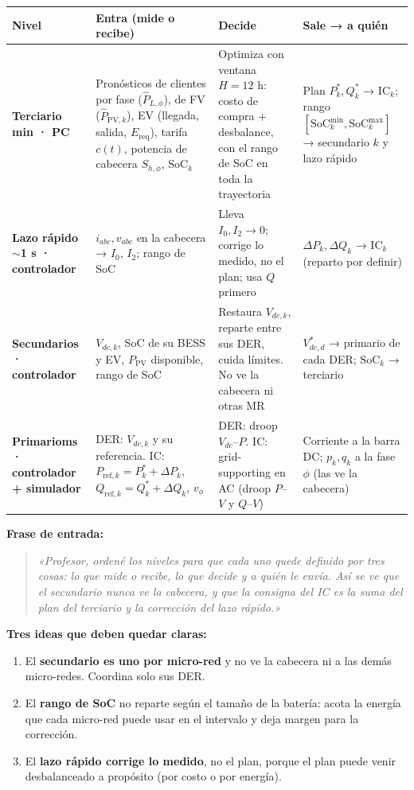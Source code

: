\documentclass[10pt,a4paper]{article}
\newcommand{\SoC}{\mathrm{SoC}}
\newcommand{\di}[1]{\begin{quote}\itshape «#1»\end{quote}}
\begin{document}
\renewcommand{\arraystretch}{1.25}
\begin{tabularx}{\textwidth}{>{\bfseries}p{1.9cm}XXX}
\toprule
Nivel & Entra (mide o recibe) & Decide & Sale → a quién\\
\midrule
Terciario\newline 15 min · PC & Pronósticos de clientes por fase ($\hat P_{L,\phi}$), de FV ($\hat P_{\mathrm{PV},k}$), EV (llegada, salida, $E_{\mathrm{req}}$), tarifa $c(t)$, potencia de cabecera $S_{h,\phi}$, $\SoC_k$ & Optimiza con ventana $H=12$ h: costo de compra + desbalance, con el rango de SoC en toda la trayectoria & Plan $P^*_k,Q^*_k$ → IC$_k$; rango $[\SoC^{\min}_k,\SoC^{\max}_k]$ → secundario $k$ y lazo rápido\\
Lazo rápido\newline $\sim$1 s · controlador & $i_{abc},v_{abc}$ en la cabecera → $I_0$, $I_2$; rango de SoC & Lleva $I_0,I_2\to0$; corrige lo medido, no el plan; usa $Q$ primero & $\Delta P_k,\Delta Q_k$ → IC$_k$ (reparto por definir)\\
Secundario\newline s · controlador & $V_{dc,k}$, SoC de su BESS y EV, $P_{\mathrm{PV}}$ disponible, rango de SoC & Restaura $V_{dc,k}$, reparte entre sus DER, cuida límites. No ve la cabecera ni otras MR & $V^*_{dc,d}$ → primario de cada DER; $\SoC_k$ → terciario\\
Primario\newline ms · controlador + simulador & DER: $V_{dc,k}$ y su referencia. IC: $P_{\mathrm{ref},k}=P^*_k+\Delta P_k$, $Q_{\mathrm{ref},k}=Q^*_k+\Delta Q_k$, $v_\phi$ & DER: droop $V_{dc}$–$P$. IC: grid-supporting en AC (droop $P$–$V$ y $Q$–$V$) & Corriente a la barra DC; $p_k,q_k$ a la fase $\phi$ (las ve la cabecera)\\
\bottomrule
\end{tabularx}

\textbf{Frase de entrada:}
\di{Profesor, ordené los niveles para que cada uno quede definido por tres cosas: lo que mide o recibe, lo que decide y a quién le envía. Así se ve que el secundario nunca ve la cabecera, y que la consigna del IC es la suma del plan del terciario y la corrección del lazo rápido.}

\textbf{Tres ideas que deben quedar claras:}
\begin{enumerate}
  \item El \textbf{secundario es uno por micro-red} y no ve la cabecera ni a las demás micro-redes. Coordina solo sus DER.
  \item El \textbf{rango de SoC} no reparte según el tamaño de la batería: acota la energía que cada micro-red puede usar en el intervalo y deja margen para la corrección.
  \item El \textbf{lazo rápido corrige lo medido}, no el plan, porque el plan puede venir desbalanceado a propósito (por costo o por energía).
\end{enumerate}
\end{document}
